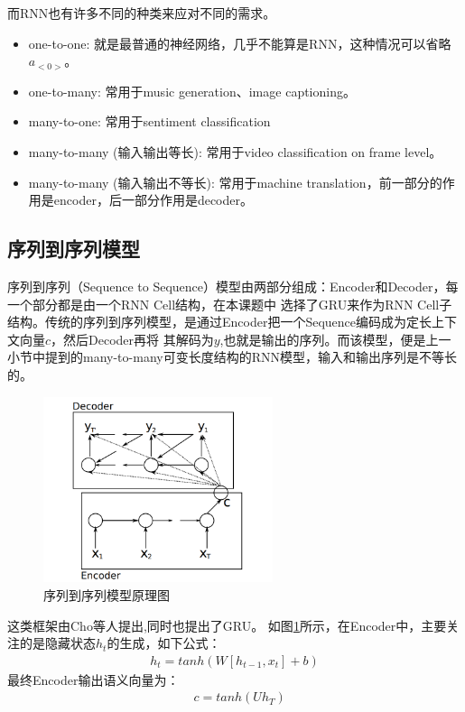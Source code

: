 \documentclass[supercite]{HustGraduPaper}
\theoremstyle{definition}
\begin{document}
而RNN也有许多不同的种类来应对不同的需求。
\begin{itemize}
  \item one-to-one: 就是最普通的神经网络，几乎不能算是RNN，这种情况可以省略$a_{<0>}$。
  \item one-to-many: 常用于music generation、image captioning。
  \item many-to-one: 常用于sentiment classification
  \item many-to-many (输入输出等长): 常用于video classification on frame level。
  \item many-to-many (输入输出不等长): 常用于machine translation，前一部分的作用是encoder，后一部分作用是decoder。
\end{itemize}

\subsection{序列到序列模型}
序列到序列（Sequence to Sequence）模型由两部分组成：Encoder和Decoder，每一个部分都是由一个RNN Cell结构，在本课题中
选择了GRU来作为RNN Cell子结构。传统的序列到序列模型，是通过Encoder把一个Sequence编码成为定长上下文向量$c$，然后Decoder再将
其解码为$y$,也就是输出的序列。而该模型，便是上一小节中提到的many-to-many可变长度结构的RNN模型，输入和输出序列是不等长的。
\begin{figure}[htbp] %
  \centering %
  \includegraphics[width=0.6\textwidth]{images/seq2seq.png} %
  \caption{序列到序列模型原理图} %
  \label{Fig.seq2seq} %
\end{figure}
这类框架由Cho\cite{cho2014learning}等人提出,同时也提出了GRU。
如图\ref{Fig.seq2seq}所示，在Encoder中，主要关注的是隐藏状态$h_t$的生成，如下公式：
\begin{align}
  h_t = tanh(W[h_{t-1},x_t] + b) \label{1}
\end{align}
最终Encoder输出语义向量为：
\begin{align}
  &c = tanh(Uh_T) \label{2}
\end{align}
\end{document}
